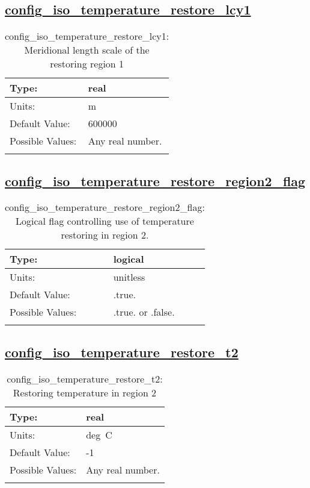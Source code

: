 \subsection[config\_iso\_temperature\_restore\_lcy1]{\hyperref[sec:nm_tab_iso]{config\_iso\_temperature\_restore\_lcy1}}
\label{subsec:nm_sec_config_iso_temperature_restore_lcy1}
\begin{center}
\begin{longtable}{| p{2.0in} || p{4.0in} |}
    \hline
    Type: & real \\
    \hline
    Units: & \si{m} \\
    \hline
    Default Value: & 600000 \\
    \hline
    Possible Values: & Any real number. \\
    \hline
    \caption{config\_iso\_temperature\_restore\_lcy1: Meridional length scale of the restoring region 1}
\end{longtable}
\end{center}
\subsection[config\_iso\_temperature\_restore\_region2\_flag]{\hyperref[sec:nm_tab_iso]{config\_iso\_temperature\_restore\_region2\_flag}}
\label{subsec:nm_sec_config_iso_temperature_restore_region2_flag}
\begin{center}
\begin{longtable}{| p{2.0in} || p{4.0in} |}
    \hline
    Type: & logical \\
    \hline
    Units: & \si{unitless} \\
    \hline
    Default Value: & .true. \\
    \hline
    Possible Values: & .true. or .false. \\
    \hline
    \caption{config\_iso\_temperature\_restore\_region2\_flag: Logical flag controlling use of temperature restoring in region 2.}
\end{longtable}
\end{center}
\subsection[config\_iso\_temperature\_restore\_t2]{\hyperref[sec:nm_tab_iso]{config\_iso\_temperature\_restore\_t2}}
\label{subsec:nm_sec_config_iso_temperature_restore_t2}
\begin{center}
\begin{longtable}{| p{2.0in} || p{4.0in} |}
    \hline
    Type: & real \\
    \hline
    Units: & \si{deg.C} \\
    \hline
    Default Value: & -1 \\
    \hline
    Possible Values: & Any real number. \\
    \hline
    \caption{config\_iso\_temperature\_restore\_t2: Restoring temperature in region 2}
\end{longtable}
\end{center}
